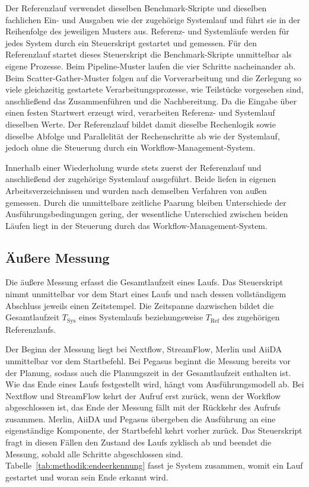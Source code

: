 Der Referenzlauf verwendet dieselben Benchmark-Skripte und
dieselben fachlichen Ein- und Ausgaben wie der zugehörige
Systemlauf und führt sie in der Reihenfolge des jeweiligen Musters
aus. Referenz- und Systemläufe werden für jedes System durch ein
Steuerskript gestartet und gemessen. Für den Referenzlauf startet
dieses Steuerskript die Benchmark-Skripte unmittelbar als eigene
Prozesse. Beim Pipeline-Muster laufen die vier Schritte
nacheinander ab. Beim Scatter-Gather-Muster folgen auf die
Vorverarbeitung und die Zerlegung so viele gleichzeitig gestartete
Verarbeitungsprozesse, wie Teilstücke vorgesehen sind, anschließend
das Zusammenführen und die Nachbereitung. Da die Eingabe über einen
festen Startwert erzeugt wird, verarbeiten Referenz- und Systemlauf
dieselben Werte. Der Referenzlauf bildet damit dieselbe Rechenlogik
sowie dieselbe Abfolge und Parallelität der Rechenschritte ab wie
der Systemlauf, jedoch ohne die Steuerung durch ein
Workflow-Management-System.

Innerhalb einer Wiederholung wurde stets zuerst der Referenzlauf
und anschließend der zugehörige Systemlauf ausgeführt. Beide liefen
in eigenen Arbeitsverzeichnissen und wurden nach demselben
Verfahren von außen gemessen. Durch die unmittelbare zeitliche
Paarung bleiben Unterschiede der Ausführungsbedingungen gering, der
wesentliche Unterschied zwischen beiden Läufen liegt in der
Steuerung durch das Workflow-Management-System.

\subsection{Äußere Messung}
\label{sec:methodik:aussen}

Die äußere Messung erfasst die Gesamtlaufzeit eines Laufs. Das
Steuerskript nimmt unmittelbar vor dem Start eines Laufs und nach
dessen vollständigem Abschluss jeweils einen Zeitstempel. Die
Zeitspanne dazwischen bildet die Gesamtlaufzeit
$T_\mathrm{Sys}$ eines Systemlaufs beziehungsweise
$T_\mathrm{Ref}$ des zugehörigen Referenzlaufs.

Der Beginn der Messung liegt bei Nextflow, StreamFlow, Merlin und
AiiDA unmittelbar vor dem Startbefehl. Bei Pegasus beginnt die
Messung bereits vor der Planung, sodass auch die Planungszeit in
der Gesamtlaufzeit enthalten ist. Wie das Ende eines Laufs festgestellt wird, hängt vom
Ausführungsmodell ab. Bei Nextflow und StreamFlow kehrt der Aufruf
erst zurück, wenn der Workflow abgeschlossen ist, das Ende der
Messung fällt mit der Rückkehr des Aufrufs zusammen. Merlin, AiiDA
und Pegasus übergeben die Ausführung an eine eigenständige
Komponente, der Startbefehl kehrt vorher zurück. Das Steuerskript
fragt in diesen Fällen den Zustand des Laufs zyklisch ab und
beendet die Messung, sobald alle Schritte abgeschlossen sind.
Tabelle~\ref{tab:methodik:endeerkennung} fasst je System zusammen,
womit ein Lauf gestartet und woran sein Ende erkannt wird.

